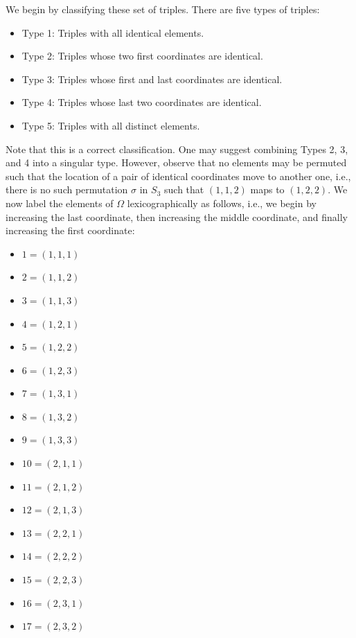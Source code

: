 \begin{solenum}
	\item We begin by classifying these set of triples.
	There are five types of triples:
	\begin{itemize}
		\item Type 1: Triples with all identical elements.
		\item Type 2: Triples whose two first coordinates are identical.
		\item Type 3: Triples whose first and last coordinates are identical.
		\item Type 4: Triples whose last two coordinates are identical.
		\item Type 5: Triples with all distinct elements.
	\end{itemize}
	Note that this is a correct classification.
	One may suggest combining Types 2, 3, and 4 into a singular type.
	However, observe that no elements may be permuted such that the location of a pair of identical coordinates move to another one, i.e., there is no such permutation $\sigma$ in $S_3$ such that $(1, 1, 2)$ maps to $(1, 2, 2)$. We now label the elements of $\Omega$ lexicographically as follows, i.e., we begin by increasing the last coordinate, then increasing the middle coordinate, and finally increasing the first coordinate:
    \begin{itemize}
        \item $1 = (1, 1, 1)$
        \item $2 = (1, 1, 2)$
        \item $3 = (1, 1, 3)$
        \item $4 = (1, 2, 1)$
        \item $5 = (1, 2, 2)$
        \item $6 = (1, 2, 3)$
        \item $7 = (1, 3, 1)$
        \item $8 = (1, 3, 2)$
        \item $9 = (1, 3, 3)$
        \item $10 = (2, 1, 1)$
        \item $11 = (2, 1, 2)$
        \item $12 = (2, 1, 3)$
        \item $13 = (2, 2, 1)$
        \item $14 = (2, 2, 2)$
        \item $15 = (2, 2, 3)$
        \item $16 = (2, 3, 1)$
        \item $17 = (2, 3, 2)$

\end{itemize}
\end{solenum}

